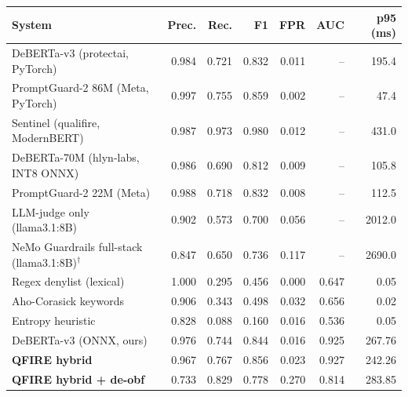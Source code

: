 \begin{tabular}{lrrrrrr}
\toprule
System & Prec. & Rec. & F1 & FPR & AUC & p95 (ms) \\
\midrule
DeBERTa-v3 (protectai, PyTorch) & 0.984 & 0.721 & 0.832 & 0.011 & -- & 195.4 \\
PromptGuard-2 86M (Meta, PyTorch) & 0.997 & 0.755 & 0.859 & 0.002 & -- & 47.4 \\
Sentinel (qualifire, ModernBERT) & 0.987 & 0.973 & 0.980 & 0.012 & -- & 431.0 \\
DeBERTa-70M (hlyn-labs, INT8 ONNX) & 0.986 & 0.690 & 0.812 & 0.009 & -- & 105.8 \\
PromptGuard-2 22M (Meta) & 0.988 & 0.718 & 0.832 & 0.008 & -- & 112.5 \\
LLM-judge only (llama3.1:8B) & 0.902 & 0.573 & 0.700 & 0.056 & -- & 2012.0 \\
NeMo Guardrails full-stack (llama3.1:8B)$^\dagger$ & 0.847 & 0.650 & 0.736 & 0.117 & -- & 2690.0 \\
\midrule
Regex denylist (lexical) & 1.000 & 0.295 & 0.456 & 0.000 & 0.647 & 0.05 \\
Aho-Corasick keywords & 0.906 & 0.343 & 0.498 & 0.032 & 0.656 & 0.02 \\
Entropy heuristic & 0.828 & 0.088 & 0.160 & 0.016 & 0.536 & 0.05 \\
DeBERTa-v3 (ONNX, ours) & 0.976 & 0.744 & 0.844 & 0.016 & 0.925 & 267.76 \\
\textbf{QFIRE hybrid} & 0.967 & 0.767 & 0.856 & 0.023 & 0.927 & 242.26 \\
\textbf{QFIRE hybrid + de-obf} & 0.733 & 0.829 & 0.778 & 0.270 & 0.814 & 283.85 \\
\bottomrule
\end{tabular}
